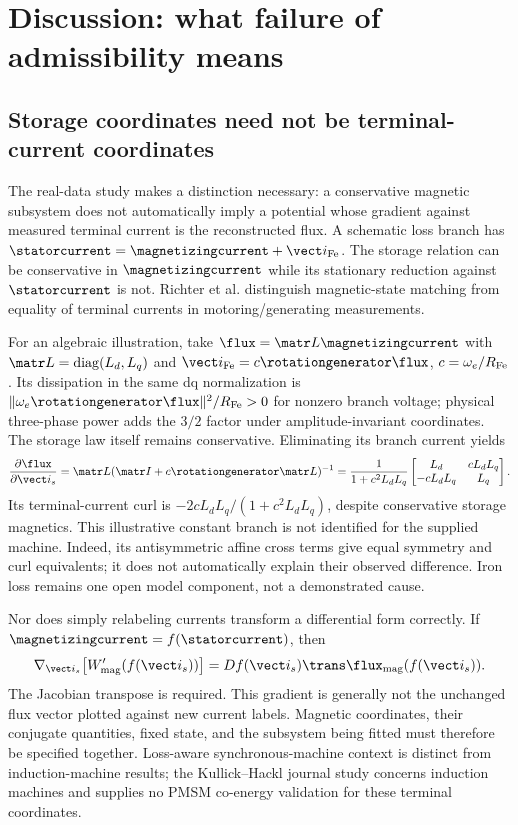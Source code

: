\section{Discussion: what failure of admissibility means}
\subsection{Storage coordinates need not be terminal-current coordinates}
The real-data study makes a distinction necessary: a conservative magnetic
subsystem does not automatically imply a potential whose gradient against
measured terminal current is the reconstructed flux. A schematic loss branch
has $\statorcurrent=\magnetizingcurrent+\vect i_{\rm Fe}$.
The storage relation can be conservative in $\magnetizingcurrent$ while its
stationary reduction against $\statorcurrent$ is not. Richter et al.
\cite{richter2014} distinguish magnetic-state matching from equality of
terminal currents in motoring/generating measurements.

For an algebraic illustration, take
$\flux=\matr L\magnetizingcurrent$ with
$\matr L=\operatorname{diag}(L_d,L_q)$ and
$\vect i_{\rm Fe}=c\rotationgenerator\flux$, $c=\omega_e/R_{\rm Fe}$.
Its dissipation in the same dq normalization is
$\|\omega_e\rotationgenerator\flux\|^2/R_{\rm Fe}>0$ for nonzero branch voltage;
physical three-phase power adds the $3/2$ factor under amplitude-invariant
coordinates. The storage law itself remains conservative. Eliminating its branch
current yields
\begin{equation}
 \frac{\partial\flux}{\partial\vect i_s}
 =\matr L(\matr I+c\rotationgenerator\matr L)^{-1}
 =\frac{1}{1+c^2L_dL_q}
 \begin{bmatrix}L_d&cL_dL_q\\-cL_dL_q&L_q\end{bmatrix}.
\end{equation}
Its terminal-current curl is $-2cL_dL_q/(1+c^2L_dL_q)$, despite conservative
storage magnetics. This illustrative constant branch is not identified for
the supplied machine. Indeed, its antisymmetric affine cross terms give
equal symmetry and curl equivalents; it does not automatically explain their
observed difference. Iron loss remains one open model component, not a
demonstrated cause.

Nor does simply relabeling currents transform a differential form correctly.
If $\magnetizingcurrent=f(\statorcurrent)$, then
\begin{equation}
 \nabla_{\vect i_s}\bigl[W'_{\rm mag}(f(\vect i_s))\bigr]
 =Df(\vect i_s)\trans\flux_{\rm mag}(f(\vect i_s)).
 \label{eq:current-pullback}
\end{equation}
The Jacobian transpose is required. This gradient is generally not the
unchanged flux vector plotted against new current labels. Magnetic coordinates,
their conjugate quantities, fixed state, and the subsystem being fitted must
therefore be specified together. Loss-aware synchronous-machine context is
distinct from induction-machine results; the Kullick--Hackl journal study
\cite{kullick2023} concerns induction machines and supplies no PMSM
co-energy validation for these terminal coordinates.
